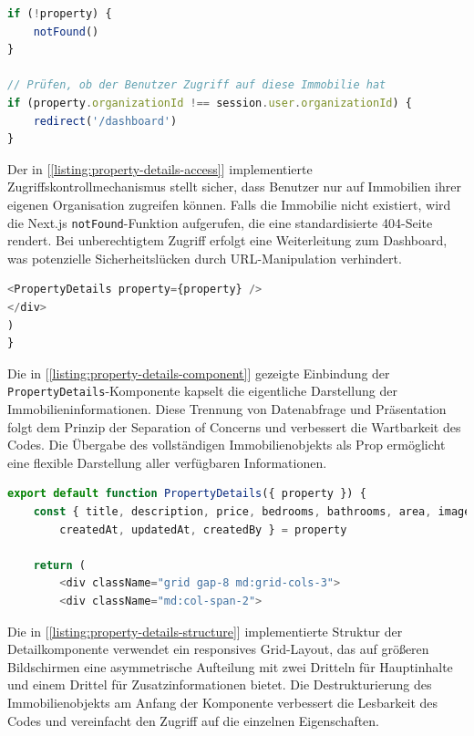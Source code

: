 \newpage
                            
\begin{lstlisting}[language=JavaScript, caption={Zugriffskontrolle.}, label={listing:property-details-access}]
if (!property) {
	notFound()
}

// Prüfen, ob der Benutzer Zugriff auf diese Immobilie hat
if (property.organizationId !== session.user.organizationId) {
	redirect('/dashboard')
}
\end{lstlisting}

							
							Der in [\ref{listing:property-details-access}] implementierte Zugriffskontrollmechanismus stellt sicher, dass Benutzer nur auf Immobilien ihrer eigenen Organisation zugreifen können. Falls die Immobilie nicht existiert, wird die Next.js \texttt{notFound}-Funktion aufgerufen, die eine standardisierte 404-Seite rendert. Bei unberechtigtem Zugriff erfolgt eine Weiterleitung zum Dashboard, was potenzielle Sicherheitslücken durch URL-Manipulation verhindert.
							
\begin{lstlisting}[language=JavaScript, caption={Einbindung der Detailkomponente.}, label={listing:property-details-component}]
<PropertyDetails property={property} />
</div>
)
}
\end{lstlisting}

						
						Die in [\ref{listing:property-details-component}] gezeigte Einbindung der \texttt{PropertyDetails}-Komponente kapselt die eigentliche Darstellung der Immobilieninformationen. Diese Trennung von Datenabfrage und Präsentation folgt dem Prinzip der Separation of Concerns und verbessert die Wartbarkeit des Codes. Die Übergabe des vollständigen Immobilienobjekts als Prop ermöglicht eine flexible Darstellung aller verfügbaren Informationen.
						
\begin{lstlisting}[language=JavaScript, caption={Struktur der Detailkomponente.}, label={listing:property-details-structure}]
export default function PropertyDetails({ property }) {
	const { title, description, price, bedrooms, bathrooms, area, images, address, 
		createdAt, updatedAt, createdBy } = property

	return (
		<div className="grid gap-8 md:grid-cols-3">
		<div className="md:col-span-2">
\end{lstlisting}

							
							Die in [\ref{listing:property-details-structure}] implementierte Struktur der Detailkomponente verwendet ein responsives Grid-Layout, das auf größeren Bildschirmen eine asymmetrische Aufteilung mit zwei Dritteln für Hauptinhalte und einem Drittel für Zusatzinformationen bietet. Die Destrukturierung des Immobilienobjekts am Anfang der Komponente verbessert die Lesbarkeit des Codes und vereinfacht den Zugriff auf die einzelnen Eigenschaften.
\newpage
                            
